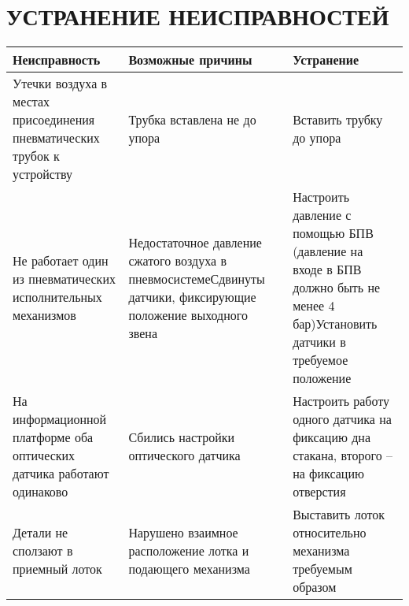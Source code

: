 \chapter{УСТРАНЕНИЕ НЕИСПРАВНОСТЕЙ}
\begin{table}[h]
    \begin{tabular}{|m{50mm}|m{50mm}|m{50mm}|}
    \hline
    Неисправность                                                            & Возможные причины                                                                                                                                        & Устранение                                                                                                                                                               \\
    \hline
    Утечки воздуха в местах присоединения пневматических трубок к устройству & Трубка вставлена не до упора                                                                                                                             & Вставить трубку до упора                                                                                                                                                 \\
    \hline
    Не работает один из пневматических исполнительных механизмов             & Недостаточное давление сжатого воздуха в пневмосистеме\newline\newline Сдвинуты датчики, фиксирующие положение выходного звена & Настроить давление с помощью БПВ (давление на входе в БПВ должно быть не менее 4 бар)\newline\newline Установить датчики в требуемое положение \\
    \hline
    На информационной платформе оба оптических датчика работают одинаково    & Сбились настройки оптического датчика                                                                                                                    & Настроить работу одного датчика на фиксацию дна стакана, второго -- на фиксацию отверстия                                                                                \\
    \hline
    Детали не сползают в приемный лоток                                      & Нарушено взаимное расположение лотка и подающего механизма                                                                                               & Выставить лоток относительно механизма требуемым образом                                                                                                                \\
    \hline
    \end{tabular}
    \end{table}



